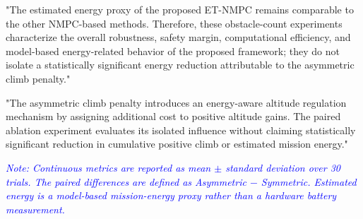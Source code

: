 \documentclass[12pt, twosides]{article}
\theoremstyle{definition}
\begin{document}
"The estimated energy proxy of the proposed ET-NMPC remains comparable to the other NMPC-based methods. Therefore, these obstacle-count experiments characterize the overall robustness, safety margin, computational efficiency, and model-based energy-related behavior of the proposed framework; they do not isolate a statistically significant energy reduction attributable to the asymmetric climb penalty."

"The asymmetric climb penalty introduces an energy-aware altitude regulation mechanism by assigning additional cost to positive altitude gains. The paired ablation experiment evaluates its isolated influence without claiming statistically significant reduction in cumulative positive climb or estimated mission energy."

\begin{table}[h!]
\centering
\captionsetup{labelformat=empty}
\caption{\textcolor{blue}{Table IV: Paired Ablation Results for the Asymmetric Climb Penalty over 30 Matched Scenarios}}
\scriptsize
\setlength{\tabcolsep}{1.3pt}
\renewcommand{\arraystretch}{1.12}
\begin{flushleft}
\textcolor{blue}{\textit{Note: Continuous metrics are reported as mean $\pm$ standard deviation over 30 trials. The paired differences are defined as Asymmetric $-$ Symmetric. Estimated energy is a model-based mission-energy proxy rather than a hardware battery measurement.}}
\end{flushleft}
\end{table}
\end{document}
